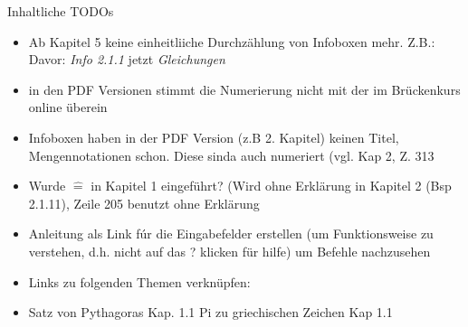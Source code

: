 \documentclass[letterpaper]{article}
\title{}
\author{Tobias Jesche}
\date{2016-05-13}
\begin{document}
{\LARGE Inhaltliche TODOs} \newline
\begin{itemize}
\item Ab Kapitel 5 keine einheitliiche Durchz\"ahlung von Infoboxen mehr. Z.B.: Davor: \textit{Info 2.1.1} jetzt \textit{Gleichungen}
\item in den PDF Versionen stimmt die Numerierung nicht mit der im Br\"uckenkurs online \"uberein
\item Infoboxen haben in der PDF Version (z.B 2. Kapitel) keinen Titel, Mengennotationen schon. Diese sinda auch numeriert (vgl. Kap 2, Z. 313
\item Wurde $\widehat{=}$ in Kapitel 1 eingef\"uhrt? (Wird ohne Erkl\"arung in Kapitel 2 (Bsp 2.1.11), Zeile 205 benutzt ohne Erkl\"arung


\item Anleitung als Link f\'ur die Eingabefelder erstellen (um Funktionsweise zu verstehen, d.h. nicht auf das ? klicken f\"ur hilfe) um Befehle nachzusehen
\item Links zu folgenden Themen verkn\"upfen:
\item Satz von Pythagoras Kap. 1.1
Pi zu griechischen Zeichen Kap 1.1
\end{itemize}
\end{document}
